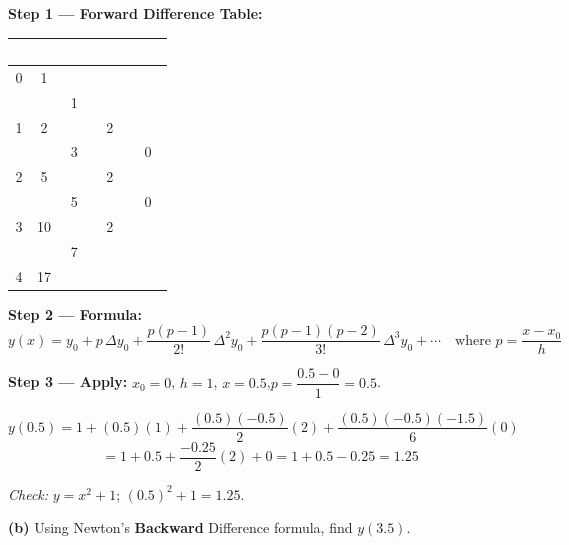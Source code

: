 \documentclass[12pt]{article}
\begin{document}
\begin{ansbox}
\textbf{Step 1 — Forward Difference Table:}

\begin{center}
\begin{tabular}{|c|c|c|c|c|}
\hline
\rowcolor{primary!80}
\textcolor{white}{\textbf{$x$}} & \textcolor{white}{\textbf{$y$}} & \textcolor{white}{\textbf{$\Delta y$}} & \textcolor{white}{\textbf{$\Delta^2 y$}} & \textcolor{white}{\textbf{$\Delta^3 y$}}\\
\hline
0 & 1 & & &\\\hline
  &   & 1 & &\\\hline
1 & 2 &   & 2 &\\\hline
  &   & 3 &   & 0\\\hline
2 & 5 &   & 2 &\\\hline
  &   & 5 &   & 0\\\hline
3 & 10 &  & 2 &\\\hline
  &    & 7 &  &\\\hline
4 & 17 &  &  &\\\hline
\end{tabular}
\end{center}

\textbf{Step 2 — Formula:}
\[
  y(x) = y_0 + p\,\Delta y_0 + \frac{p(p-1)}{2!}\,\Delta^2 y_0 + \frac{p(p-1)(p-2)}{3!}\,\Delta^3 y_0 + \cdots
  \quad\text{where } p = \frac{x-x_0}{h}
\]

\textbf{Step 3 — Apply:} $x_0=0$, $h=1$, $x=0.5$,\quad $p = \dfrac{0.5-0}{1} = 0.5$.

\[
  y(0.5) = 1 + (0.5)(1) + \frac{(0.5)(-0.5)}{2}(2) + \frac{(0.5)(-0.5)(-1.5)}{6}(0)
\]
\[
  = 1 + 0.5 + \frac{-0.25}{2}(2) + 0 = 1 + 0.5 - 0.25 = \boxed{\mathbf{1.25}}
\]

\textit{Check:} $y = x^2+1$;\; $(0.5)^2+1 = 1.25$.\;\checkmark
\end{ansbox}

\medskip
\textbf{(b)} Using Newton's \textbf{Backward} Difference formula, find $y(3.5)$.
\end{document}
